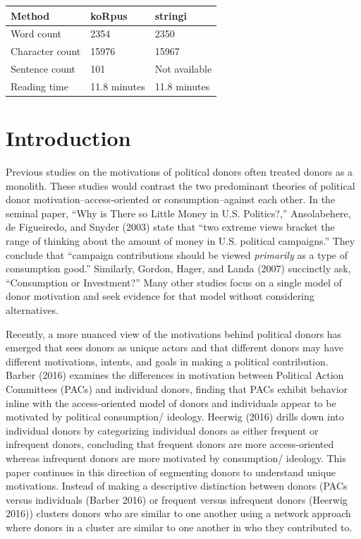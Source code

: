 \documentclass[12pt,]{article}
\begin{document}
\vskip -8.5pt



\noindent \doublespacing 

\begin{longtable}[]{@{}lll@{}}
\toprule
Method & koRpus & stringi\tabularnewline
\midrule
\endhead
Word count & 2354 & 2350\tabularnewline
Character count & 15976 & 15967\tabularnewline
Sentence count & 101 & Not available\tabularnewline
Reading time & 11.8 minutes & 11.8 minutes\tabularnewline
\bottomrule
\end{longtable}

\newpage

\hypertarget{introduction}{%
\section{Introduction}\label{introduction}}

Previous studies on the motivations of political donors often treated
donors as a monolith. These studies would contrast the two predominant
theories of political donor motivation--access-oriented or
consumption--against each other. In the seminal paper, ``Why is There so
Little Money in U.S. Politics?,'' Ansolabehere, de Figueiredo, and
Snyder (2003) state that ``two extreme views bracket the range of
thinking about the amount of money in U.S. political campaigns.'' They
conclude that ``campaign contributions should be viewed \emph{primarily}
as a type of consumption good.'' Similarly, Gordon, Hager, and Landa
(2007) succinctly ask, ``Consumption or Investment?'' Many other studies
focus on a single model of donor motivation and seek evidence for that
model without considering alternatives.

Recently, a more nuanced view of the motivations behind political donors
has emerged that sees donors as unique actors and that different donors
may have different motivations, intents, and goals in making a political
contribution. Barber (2016) examines the differences in motivation
between Political Action Committees (PACs) and individual donors,
finding that PACs exhibit behavior inline with the access-oriented model
of donors and individuals appear to be motivated by political
consumption/ ideology. Heerwig (2016) drills down into individual donors
by categorizing individual donors as either frequent or infrequent
donors, concluding that frequent donors are more access-oriented whereas
infrequent donors are more motivated by consumption/ ideology. This
paper continues in this direction of segmenting donors to understand
unique motivations. Instead of making a descriptive distinction between
donors (PACs versus individuals (Barber 2016) or frequent versus
infrequent donors (Heerwig 2016)) clusters donors who are similar to one
another using a network approach where donors in a cluster are similar
to one another in who they contributed to.
\end{document}
